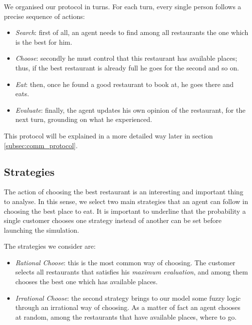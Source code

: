 \documentclass[10pt,a4paper,usenatbib]{article}
\begin{document}
We organised our protocol in turns. For each turn, every single person
follows a precise sequence of actions:
\begin{itemize}
\item\textit{Search}: first of all, an agent needs to find among all
restaurants the one which is the best for him.
\item\textit{Choose}: secondly he must control that this restaurant has
available places; thus, if the best restaurant is already full he
goes for the second and so on.
\item\textit{Eat}: then, once he found a good restaurant to book at,
he goes there and eats.
\item\textit{Evaluate}: finally, the agent updates his own opinion of
the restaurant, for the next turn, grounding on what he experienced.
\end{itemize}
This protocol will be explained in a more detailed way later in section \ref{subsec:comm_protocol}.


\subsection{Strategies}
\label{subsec:strategies}
The action of choosing the best restaurant is an interesting and important
thing to analyse. In this sense, we select two main strategies that
an agent can follow in choosing the best place to eat. It is important
to underline that the probability a single customer chooses one strategy
instead of another can be set before launching the simulation.

The strategies we consider are:
\begin{itemize}
\item\textit{Rational Choose}: this is the most common way of choosing.
The customer selects all restaurants that satisfies his \emph{maximum
evaluation}, and among them chooses the best one which has available
places.
\item\textit{Irrational Choose}: the second strategy brings to our model
some fuzzy logic through an irrational way of choosing. As a matter
of fact an agent chooses at random, among the restaurants that have
available places, where to go.
\end{itemize}
\end{document}
